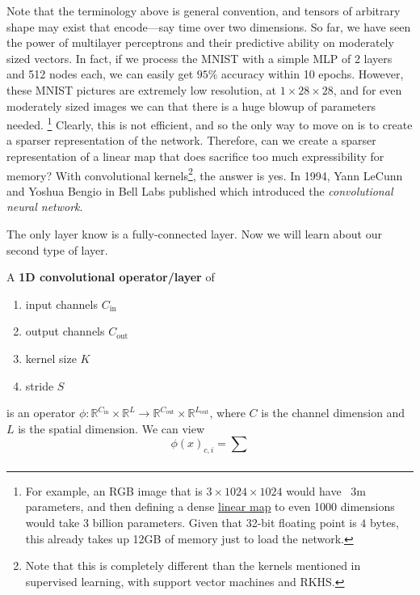   Note that the terminology above is general convention, and tensors of arbitrary shape may exist that encode---say time over two dimensions. So far, we have seen the power of multilayer perceptrons and their predictive ability on moderately sized vectors. In fact, if we process the MNIST with a simple MLP of 2 layers and 512 nodes each, we can easily get $95\%$ accuracy within 10 epochs. However, these MNIST pictures are extremely low resolution, at $1 \times 28 \times 28$, and for even moderately sized images we can that there is a huge blowup of parameters needed. \footnote{For example, an RGB image that is $3 \times 1024 \times 1024$ would have ~3m parameters, and then defining a dense \hyperref[lin-def:linear_map]{linear map} to even 1000 dimensions would take 3 billion parameters. Given that 32-bit floating point is $4$ bytes, this already takes up 12GB of memory just to load the network.} Clearly, this is not efficient, and so the only way to move on is to create a sparser representation of the network. Therefore, can we create a sparser representation of a linear map that does sacrifice too much expressibility for memory? With convolutional kernels\footnote{Note that this is completely different than the kernels mentioned in supervised learning, with support vector machines and RKHS.}, the answer is yes. In 1994, Yann LeCunn and Yoshua Bengio in Bell Labs published \cite{cnn} which introduced the \textit{convolutional neural network}. 

  The only layer know is a fully-connected layer. Now we will learn about our second type of layer. 

  \begin{definition}
    \label{def:1d-convolutional-layer}
    A \textbf{1D convolutional operator/layer} of 
    \begin{enumerate}
      \item input channels $C_{\mathrm{in}}$ 
      \item output channels $C_{\mathrm{out}}$ 
      \item kernel size $K$ 
      \item stride $S$
    \end{enumerate}
    is an operator $\phi: \mathbb{R}^{C_{\mathrm{in}}} \times \mathbb{R}^L \rightarrow \mathbb{R}^{C_{\mathrm{out}}} \times \mathbb{R}^{L_{\mathrm{out}}}$, where $C$ is the channel dimension and $L$ is the spatial dimension. We can view 
    \begin{equation}
      \phi(x)_{c, i} = \sum_{} 
    \end{equation}
  \end{definition}

